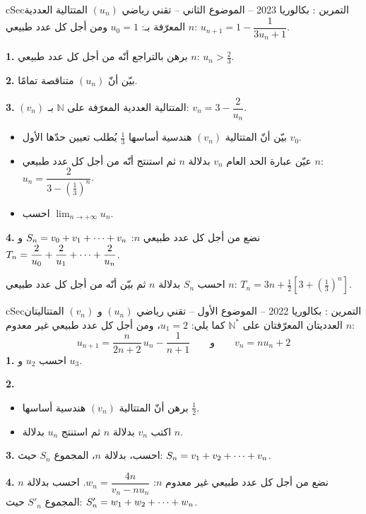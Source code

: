\documentclass[12pt,a4paper]{article}
\newenvironment{BOX}[2]{\begin{otherlanguage}{english}\begin{arbox}{#1}{#2}}{\end{arbox}\end{otherlanguage}}
\newcounter{exo}
\newenvironment{tamrin}[1]{\stepcounter{exo}\begin{BOX}{cSec}{التمرين \theexo: #1}}{\end{BOX}}
\renewcommand{\cdots}{\mathinner{\cdotp\cdotp\cdotp}}
\newcommand{\N}{\mathbb{N}}
\newcommand{\limn}{\displaystyle\lim_{n\to+\infty}}
\newenvironment{sq}{\begin{itemize}[leftmargin=2.4em,itemsep=3pt]}{\end{itemize}}
\newcommand{\qa}{\item[(أ)]}\newcommand{\qb}{\item[(ب)]}\newcommand{\qc}{\item[(جـ)]}\newcommand{\qd}{\item[(د)]}\newcommand{\qe}{\item[(هـ)]}
\begin{document}
\begin{tamrin}{بكالوريا 2023 -- الموضوع الثاني -- تقني رياضي}
$(u_n)$ المتتالية العددية المعرّفة بـ: $u_0=1$ ومن أجل كل عدد طبيعي $n$: $u_{n+1}=1-\dfrac{1}{3u_n+1}$.

\textbf{1.} برهن بالتراجع أنّه من أجل كل عدد طبيعي $n$: $u_n>\frac23$.

\textbf{2.} بيّن أنّ $(u_n)$ متناقصة تمامًا.

\textbf{3.} $(v_n)$ المتتالية العددية المعرّفة على $\N$ بـ: $v_n=3-\dfrac{2}{u_n}$.
\begin{sq}
\qa بيّن أنّ المتتالية $(v_n)$ هندسية أساسها $\frac13$ يُطلب تعيين حدّها الأول $v_0$.
\qb عيّن عبارة الحد العام $v_n$ بدلالة $n$ ثم استنتج أنّه من أجل كل عدد طبيعي $n$: $u_n=\dfrac{2}{3-\left(\frac13\right)^n}$.
\qc احسب $\limn u_n$.
\end{sq}
\textbf{4.} نضع من أجل كل عدد طبيعي $n$: $S_n=v_0+v_1+\cdots+v_n$ و $T_n=\dfrac{2}{u_0}+\dfrac{2}{u_1}+\cdots+\dfrac{2}{u_n}$.

احسب $S_n$ بدلالة $n$ ثم بيّن أنّه من أجل كل عدد طبيعي $n$: $T_n=3n+\frac12\left[3+\left(\frac13\right)^n\right]$.
\end{tamrin}

\begin{tamrin}{بكالوريا 2022 -- الموضوع الأول -- تقني رياضي}
$(u_n)$ و $(v_n)$ المتتاليتان العدديتان المعرّفتان على $\N^*$ كما يلي: $u_1=2$، ومن أجل كل عدد طبيعي غير معدوم $n$:
\[u_{n+1}=\frac{n}{2n+2}\,u_n-\frac{1}{n+1}\qquad\text{و}\qquad v_n=nu_n+2\]
\textbf{1.} احسب $u_2$ و $u_3$.

\textbf{2.}
\begin{sq}
\qa برهن أنّ المتتالية $(v_n)$ هندسية أساسها $\frac12$.
\qb اكتب $v_n$ بدلالة $n$ ثم استنتج $u_n$ بدلالة $n$.
\end{sq}
\textbf{3.} احسب، بدلالة $n$، المجموع $S_n$ حيث: $S_n=v_1+v_2+\cdots+v_n$.

\textbf{4.} نضع من أجل كل عدد طبيعي غير معدوم $n$: $w_n=\dfrac{4n}{v_n-nu_n}$.
احسب بدلالة $n$ المجموع $S'_n$ حيث: $S'_n=w_1+w_2+\cdots+w_n$.
\end{tamrin}
\end{document}
